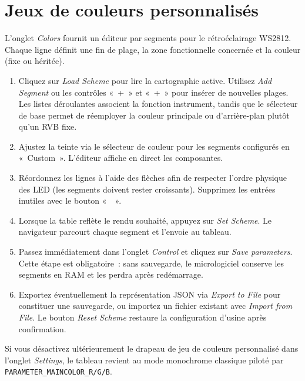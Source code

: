 \section{Jeux de couleurs personnalisés}
L'onglet \emph{Colors} fournit un éditeur par segments pour le rétroéclairage WS2812. Chaque ligne définit une fin de plage, la zone fonctionnelle concernée et la couleur (fixe ou héritée).

\begin{enumerate}
    \item Cliquez sur \emph{Load Scheme} pour lire la cartographie active. Utilisez \emph{Add Segment} ou les contrôles «~+\textuparrow{}~» et «~+\textdownarrow{}~» pour insérer de nouvelles plages. Les listes déroulantes associent la fonction instrument, tandis que le sélecteur de base permet de réemployer la couleur principale ou d'arrière-plan plutôt qu'un RVB fixe.
    \item Ajustez la teinte via le sélecteur de couleur pour les segments configurés en «~Custom~». L'éditeur affiche en direct les composantes.
    \item Réordonnez les lignes à l'aide des flèches afin de respecter l'ordre physique des LED (les segments doivent rester croissants). Supprimez les entrées inutiles avec le bouton «~\texttimes{}~».
    \item Lorsque la table reflète le rendu souhaité, appuyez sur \emph{Set Scheme}. Le navigateur parcourt chaque segment et l'envoie au tableau.
    \item Passez immédiatement dans l'onglet \emph{Control} et cliquez sur \emph{Save parameters}. Cette étape est obligatoire~: sans sauvegarde, le micrologiciel conserve les segments en RAM et les perdra après redémarrage.
    \item Exportez éventuellement la représentation JSON via \emph{Export to File} pour constituer une sauvegarde, ou importez un fichier existant avec \emph{Import from File}. Le bouton \emph{Reset Scheme} restaure la configuration d'usine après confirmation.
\end{enumerate}

Si vous désactivez ultérieurement le drapeau de jeu de couleurs personnalisé dans l'onglet \emph{Settings}, le tableau revient au mode monochrome classique piloté par \verb|PARAMETER_MAINCOLOR_R/G/B|.
